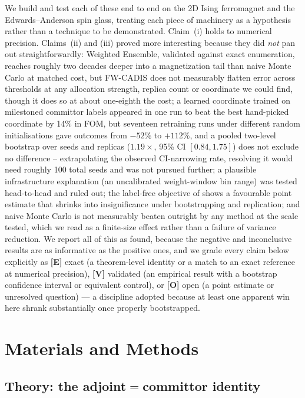 \documentclass[a4paper,fleqn]{cas-sc}
\begin{document}
We build and test each of these end to end on the 2D Ising ferromagnet and the
Edwards--Anderson spin glass, treating each piece of machinery as a hypothesis rather than
a technique to be demonstrated. Claim~(i) holds to numerical precision. Claims~(ii) and
(iii) proved more interesting because they did \emph{not} pan out straightforwardly:
Weighted Ensemble, validated against exact enumeration, reaches roughly two decades deeper
into a magnetization tail than naive Monte Carlo at matched cost, but FW-CADIS does not
measurably flatten error across thresholds at any allocation strength, replica count or
coordinate we could find, though it does so at about one-eighth the cost; a learned
coordinate trained on milestoned committor labels appeared in one run to beat the best
hand-picked coordinate by 14\% in FOM, but seventeen retraining runs under different random
initialisations gave outcomes from $-52\%$ to $+112\%$, and a pooled two-level bootstrap
over seeds and replicas ($1.19\times$, 95\% CI $[0.84,1.75]$) does not exclude no
difference -- extrapolating the observed CI-narrowing rate, resolving it would need
roughly 100 total seeds and was not pursued further; a plausible infrastructure
explanation (an uncalibrated weight-window bin range) was tested head-to-head and ruled
out; the label-free objective of \cite{kim2026} shows a favourable point
estimate that shrinks into insignificance under bootstrapping and replication; and naive
Monte Carlo is not measurably beaten outright by any method at the scale tested, which we
read as a finite-size effect rather than a failure of variance reduction. We report all of
this as found, because the negative and inconclusive results are as informative as the
positive ones, and we grade every claim below explicitly as \textbf{[E]} exact (a
theorem-level identity or a match to an exact reference at numerical precision),
\textbf{[V]} validated (an empirical result with a bootstrap confidence interval or
equivalent control), or \textbf{[O]} open (a point estimate or unresolved question) ---
a discipline adopted because at least one apparent win here shrank substantially once
properly bootstrapped.

\section{Materials and Methods}\label{sec:methods}

\subsection{Theory: the adjoint$=$committor identity}\label{sec:theory}
\end{document}
